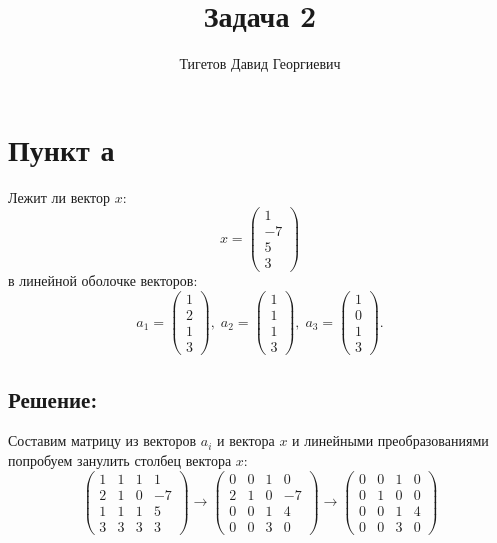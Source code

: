 \documentclass[12pt]{article}
\begin{document}
    \title{Задача 2}
    \author{Тигетов Давид Георгиевич}
    \date{}
    \maketitle

    \section*{Пункт а}
    Лежит ли вектор $x$:
    \[
        x =
        \begin{pmatrix}
            1 \\ -7 \\ 5 \\ 3
        \end{pmatrix}
    \]
    в линейной оболочке векторов:
    \[
        a_1 =
        \begin{pmatrix}
            1 \\ 2 \\ 1 \\ 3
        \end{pmatrix}, \;
        a_2 =
        \begin{pmatrix}
            1 \\ 1 \\ 1 \\ 3
        \end{pmatrix}, \;
        a_3 =
        \begin{pmatrix}
            1 \\ 0 \\ 1 \\ 3
        \end{pmatrix}.
    \]

    \subsection*{Решение:}
    Составим матрицу из векторов $a_i$ и вектора $x$ и линейными преобразованиями попробуем занулить столбец вектора $x$:
    \[
        \begin{pmatrix}
            1 & 1 & 1 & 1  \\
            2 & 1 & 0 & -7 \\
            1 & 1 & 1 & 5  \\
            3 & 3 & 3 & 3
        \end{pmatrix}
        \rightarrow
        \begin{pmatrix}
            0 & 0 & 1 & 0  \\
            2 & 1 & 0 & -7 \\
            0 & 0 & 1 & 4  \\
            0 & 0 & 3 & 0
        \end{pmatrix}
        \rightarrow
        \begin{pmatrix}
            0 & 0 & 1 & 0 \\
            0 & 1 & 0 & 0 \\
            0 & 0 & 1 & 4 \\
            0 & 0 & 3 & 0
        \end{pmatrix}
    \]
\end{document}
